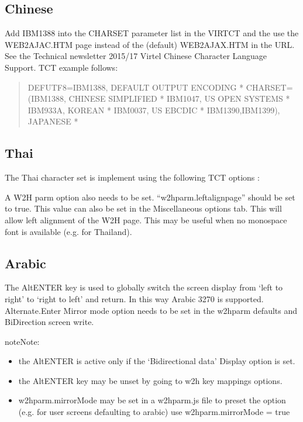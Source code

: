 \documentclass[letterpaper,10pt,english]{sphinxmanual}
\begin{document}
\subsection{Chinese}
\label{\detokenize{Customization:chinese}}
\sphinxAtStartPar
Add IBM1388 into the CHARSET parameter list in the VIRTCT and the use the WEB2AJAC.HTM page instead of the (default) WEB2AJAX.HTM in the URL. See the Technical newsletter 2015/17 Virtel Chinese Character Language Support. TCT example follows: \sphinxhyphen{}
\begin{quote}

\sphinxAtStartPar
DEFUTF8=IBM1388,        DEFAULT OUTPUT ENCODING         *
CHARSET=(IBM1388,       CHINESE SIMPLIFIED              *
IBM1047,                US OPEN SYSTEMS                 *
IBM933A,                KOREAN                          *
IBM0037,                US EBCDIC                       *
IBM1390,IBM1399),       JAPANESE                        *
\end{quote}


\subsection{Thai}
\label{\detokenize{Customization:thai}}
\sphinxAtStartPar
The Thai character set is implement using the following TCT options : \sphinxhyphen{}

\sphinxAtStartPar
A W2H parm option also needs to be set. “w2hparm.leftalignpage” should be set to true. This value can also be set in the Miscellaneous options tab. This will allow left alignment of the W2H page. This may be useful when no monospace font is available (e.g. for Thailand).


\subsection{Arabic}
\label{\detokenize{Customization:arabic}}
\sphinxAtStartPar
The Alt\sphinxhyphen{}ENTER key is used to globally switch the screen display from ‘left to right’ to ‘right to left’ and return. In this way Arabic 3270 is supported. Alternate.Enter Mirror mode option needs to be set in the w2hparm defaults and Bi\sphinxhyphen{}Direction screen write.

\begin{sphinxadmonition}{note}{Note:}\begin{itemize}
\item {} 
\sphinxAtStartPar
the Alt\sphinxhyphen{}ENTER is active only if the ‘Bidirectional data’ Display option is set.

\item {} 
\sphinxAtStartPar
the Alt\sphinxhyphen{}ENTER key may be unset by going to w2h key mappings options.

\item {} 
\sphinxAtStartPar
w2hparm.mirrorMode may be set in a w2hparm.js file to preset the option (e.g. for user screens defaulting to arabic) use w2hparm.mirrorMode = true

\end{itemize}
\end{sphinxadmonition}
\end{document}
